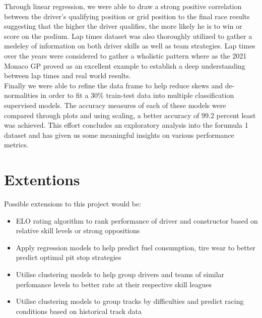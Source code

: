 \documentclass[10pt,twocolumn,letterpaper]{article}
\begin{document}
Through linear regression, we were able to draw a strong positive correlation between the driver's qualifying position or grid position to the final race results suggesting that the higher the driver qualifies, the more likely he is to win or score on the podium. Lap times dataset was also thoroughly utilized to gather a medeley of information on both driver skills as well as team strategies. Lap times over the years were considered to gather a wholistic pattern where as the 2021 Monaco GP proved as an excellent example to establish a deep understanding between lap times and real world results. \\

Finally we were able to refine the data frame to help reduce skews and de-normalities in order to fit a 30\% train-test data into multiple classification supervised models. The accuracy measures of each of these models were compared through plots and using scaling, a better accuracy of 99.2 percent least was achieved. This effort concludes an exploratory analysis into the forumula 1 dataset and has given us some meaningful insights on various performance metrics. \\

\section{Extentions}
Possible extensions to this project would be: 
\begin{itemize}
    \item ELO rating algorithm to rank performance of driver and constructor based on relative skill levels or strong oppositions
    \item Apply regression models to help predict fuel consumption, tire wear to better predict optimal pit stop strategies
    \item Utilise clustering models to help group drivers and teams of similar perfomance levels to better rate at their respective skill leagues
    \item Utilise clustering models to group tracks by difficulties and predict racing conditions based on historical track data
\end{itemize}




\end{document}
